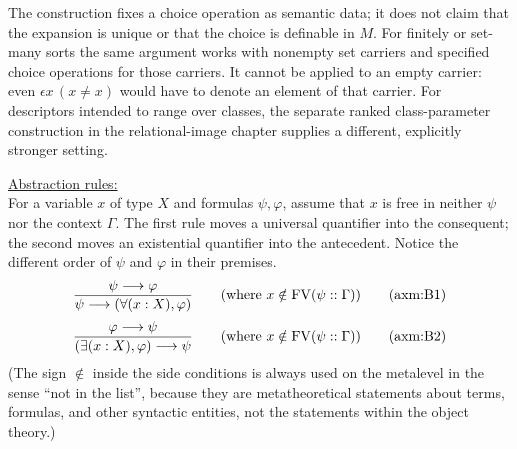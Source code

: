 The construction fixes a choice operation as semantic data; it does not
claim that the expansion is unique or that the choice is definable in
$M$. For finitely or set-many sorts the same argument works with
nonempty set carriers and specified choice operations for those carriers.
It cannot be applied to an empty carrier: even
$\epsilon x\,(x\ne x)$ would have to denote an element of that carrier.
For descriptors intended to range over classes, the separate ranked
class-parameter construction in the relational-image chapter supplies a
different, explicitly stronger setting.

\underline{Abstraction rules:}\\%
For a variable $x$ of type $X$ and formulas $\psi,\varphi$, assume that
$x$ is free in neither $\psi$ nor the context $\Gamma$. The first rule moves
a universal quantifier into the consequent; the second moves an existential
quantifier into the antecedent. Notice the different order of $\psi$ and
$\varphi$ in their premises.
\[
\frac{
\psi \implies \varphi
}{
\psi \implies (\forall (x:X),\varphi)
}
\quad\quad(\mbox{where }x\notin\FV(\psi::\Gamma))
\labeltagd{axm}{B1}
\]
\[
\frac{
\varphi \implies \psi
}{
(\exists (x:X),\varphi)\implies \psi
}
\quad\quad(\mbox{where }x\notin\FV(\psi::\Gamma))
\labeltagd{axm}{B2}
\]
(The sign $\notin$ inside the side conditions is always used on the metalevel in the sense ``not in the list'', because they are metatheoretical statements about terms, formulas, and other syntactic entities, not the statements within the object theory.)


